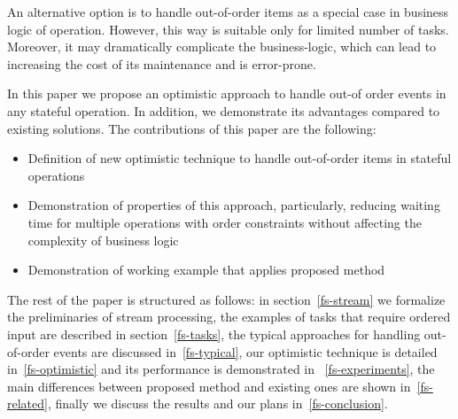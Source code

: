 An alternative option is to handle out-of-order items as a special case in business logic of operation. However, this way is suitable only for limited number of tasks. Moreover, it may dramatically complicate the business-logic, which can lead to increasing the cost of its maintenance and is error-prone.

In this paper we propose an optimistic approach to handle out-of order events in any stateful operation. In addition, we demonstrate its advantages compared to existing solutions. The contributions of this paper are the following: 
\begin {itemize}
\item Definition of new optimistic technique to handle out-of-order items in stateful operations
\item Demonstration of properties of this approach, particularly, reducing waiting time for multiple operations with order constraints without affecting the complexity of business logic
\item Demonstration of working example that applies proposed method
\end {itemize}

The rest of the paper is structured as follows: in section~\ref{fs-stream} we formalize the preliminaries of stream processing, the examples of tasks that require ordered input are described in section~\ref{fs-tasks}, the typical approaches for handling out-of-order events are discussed in~\ref{fs-typical}, our optimistic technique is detailed in~\ref{fs-optimistic} and its performance is demonstrated in ~\ref{fs-experiments}, the main differences between proposed method and existing ones are shown in~\ref{fs-related}, finally we discuss the results and our plans in~\ref{fs-conclusion}.